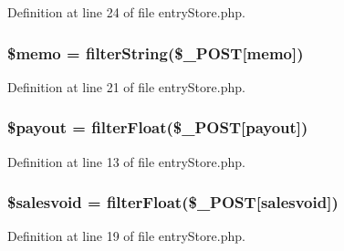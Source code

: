 Definition at line 24 of file entry\+Store.\+php.

\subsubsection[{\texorpdfstring{\$memo}{$memo}}]{\setlength{\rightskip}{0pt plus 5cm}\$memo = {\bf filter\+String}(\$\+\_\+\+P\+O\+ST\mbox{[}\textquotesingle{}memo\textquotesingle{}\mbox{]})}\hypertarget{entry_store_8php_a4ed302f6d17ec82f553fbd029e52ab7e}{}\label{entry_store_8php_a4ed302f6d17ec82f553fbd029e52ab7e}


Definition at line 21 of file entry\+Store.\+php.

\subsubsection[{\texorpdfstring{\$payout}{$payout}}]{\setlength{\rightskip}{0pt plus 5cm}\$payout = {\bf filter\+Float}(\$\+\_\+\+P\+O\+ST\mbox{[}\textquotesingle{}payout\textquotesingle{}\mbox{]})}\hypertarget{entry_store_8php_ae344e604ec98f96f5ad2075e96f20095}{}\label{entry_store_8php_ae344e604ec98f96f5ad2075e96f20095}


Definition at line 13 of file entry\+Store.\+php.

\subsubsection[{\texorpdfstring{\$salesvoid}{$salesvoid}}]{\setlength{\rightskip}{0pt plus 5cm}\$salesvoid = {\bf filter\+Float}(\$\+\_\+\+P\+O\+ST\mbox{[}\textquotesingle{}salesvoid\textquotesingle{}\mbox{]})}\hypertarget{entry_store_8php_a1409aee267ba462f0eb32c242b06634d}{}\label{entry_store_8php_a1409aee267ba462f0eb32c242b06634d}


Definition at line 19 of file entry\+Store.\+php.

